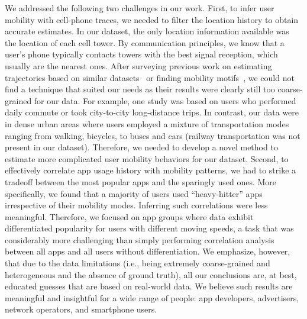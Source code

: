 We addressed the following two challenges in our work.
First, to infer user mobility with cell-phone traces,
we needed to filter the location history to obtain accurate estimates. In our dataset, the only location information available was the %
location of each cell tower. By communication principles, we know that a user's phone typically contacts towers with the best signal reception, which usually are the nearest ones. 
After surveying previous work on estimating trajectories based on similar datasets~\cite{smoreda2013spatiotemporal, hoteit2014estimating, widhalm2015discovering, Alsolami2012Auth, jiang2013review} or finding mobility motifs~\cite{wang2014mobile, gambs2012next}, we could not find a technique that suited our needs as their results were clearly still too coarse-grained for our data. %
For example, one study was based on users who performed daily commute or took city-to-city long-distance trips. In contrast, our data were in dense urban areas where users employed a mixture of transportation modes ranging from walking, bicycles, to buses and cars (railway transportation was not present in our dataset). Therefore, we needed to develop a novel method to estimate more complicated user mobility behaviors for our dataset.
Second, to effectively correlate app usage history with mobility patterns, we had to strike a tradeoff between the most popular apps and the sparingly used ones. More specifically, we found that a majority of users used ``heavy-hitter'' apps irrespective of their mobility modes. Inferring such correlations were less meaningful. Therefore, we focused on app groups where data exhibit differentiated popularity for users with different moving speeds, a task that was considerably more challenging than simply performing correlation analysis between all apps and all users without differentiation. %
We emphasize, however, that due to the data limitations (i.e., being extremely coarse-grained and heterogeneous and the absence of ground truth),
all our conclusions are, at best, educated guesses that are based on real-world data. We believe such results are meaningful and insightful for a wide range of people: app developers, advertisers, network operators, and smartphone users.

